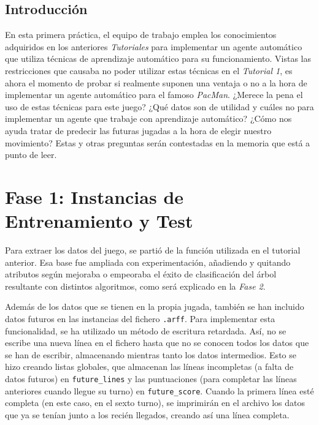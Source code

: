 \documentclass[12pt]{article}
\begin{document}
\tableofcontents

\newpage

\clearpage
\vspace*{\fill}
\begin{center}
    \begin{minipage}{\textwidth}
        \begin{center}
            \section*{Introducción}
            En esta primera práctica, el equipo de trabajo emplea los conocimientos adquiridos en los anteriores \emph{Tutoriales} para implementar un agente automático que utiliza técnicas de aprendizaje automático para su funcionamiento. Vistas las restricciones que causaba no poder utilizar estas técnicas en el \emph{Tutorial 1}, es ahora el momento de probar si realmente suponen una ventaja o no a la hora de implementar un agente automático para el famoso \emph{PacMan}. ¿Merece la pena el uso de estas técnicas para este juego? ¿Qué datos son de utilidad y cuáles no para implementar un agente que trabaje con aprendizaje automático? ¿Cómo nos ayuda tratar de predecir las futuras jugadas a la hora de elegir nuestro movimiento? Estas y otras preguntas serán contestadas en la memoria que está a punto de leer.
        \end{center}
    \end{minipage}
\end{center}
\vfill

\newpage
\section{Fase 1: Instancias de Entrenamiento y Test}

Para extraer los datos del juego, se partió de la función utilizada en el tutorial anterior. Esa base fue ampliada con experimentación, añadiendo y quitando atributos según mejoraba o empeoraba el éxito de clasificación del árbol resultante con distintos algoritmos, como será explicado en la \emph{Fase 2}.

Además de los datos que se tienen en la propia jugada, también se han incluido datos futuros en las instancias del fichero \texttt{.arff}. Para implementar esta funcionalidad, se ha utilizado un método de escritura retardada. Así, no se escribe una nueva línea en el fichero hasta que no se conocen todos los datos que se han de escribir, almacenando mientras tanto los datos intermedios. Esto se hizo creando listas globales, que almacenan las líneas incompletas (a falta de datos futuros) en \texttt{future\_lines} y las puntuaciones (para completar las líneas anteriores cuando llegue su turno) en \texttt{future\_score}. Cuando la primera línea esté completa (en este caso, en el sexto turno), se imprimirán en el archivo los datos que ya se tenían junto a los recién llegados, creando así una línea completa.
\end{document}
